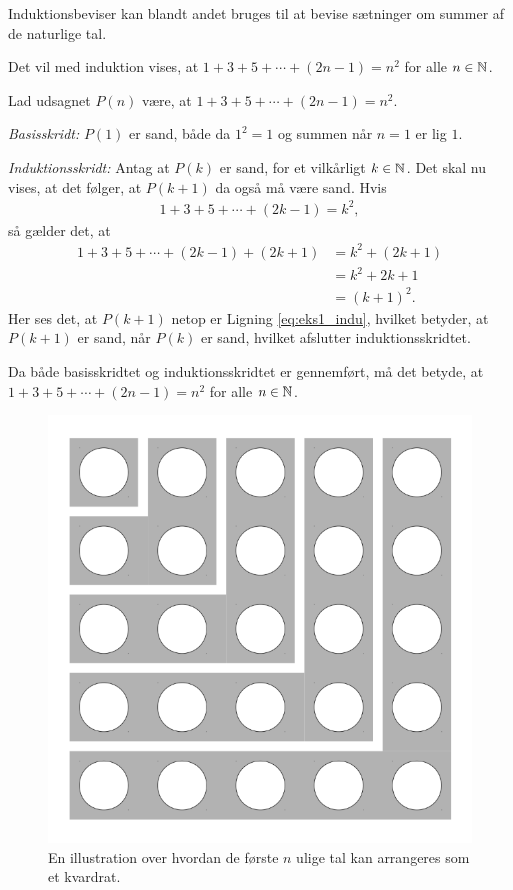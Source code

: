 Induktionsbeviser kan blandt andet bruges til at bevise sætninger om summer af de naturlige tal.
\begin{exmp}
	Det vil med induktion vises, at $1 + 3 + 5 + \dotsb + (2n-1) = n^2$ for alle $n \in \mathbb{N}$.

	Lad udsagnet $P(n)$ være, at $1 + 3 + 5 + \dotsb + (2n-1) = n^2$.
	
	\textit{Basisskridt:} $P(1)$ er sand, både da $1^2 = 1$ og summen når $n = 1$ er lig $1$.

	\textit{Induktionsskridt:} Antag at $P(k)$ er sand, for et vilkårligt $k \in \mathbb{N}$.
	Det skal nu vises, at det følger, at $P(k + 1)$ da også må være sand. 
	Hvis
	\begin{align}
		1 + 3 + 5 + \dotsb + (2k-1) 
		= k^2, \nonumber
	\end{align}
	så gælder det, at
	\begin{align}
		1 + 3 + 5 + \dotsb + (2k-1) + (2k+1) 
		&= k^2 + (2k + 1) \nonumber \\
		&= k^2 + 2k + 1 \nonumber \\
		&= \left( k + 1 \right) ^2. \label{eq:eks1_indu}
	\end{align}
	Her ses det, at $P(k + 1)$ netop er Ligning \eqref{eq:eks1_indu}, hvilket betyder, at $P(k + 1)$ er sand, når $P(k)$ er sand, hvilket afslutter induktionsskridtet.

	Da både basisskridtet og induktionsskridtet er gennemført, må det betyde, at $1 + 3 + 5 + \dotsb + (2n-1) = n^2$ for alle $n \in \mathbb{N}$.
\end{exmp}

\begin{figure}
	\centering
	\includegraphics[scale=0.21]{fig/img/sum_of_n_first_odd_integers.png}
	\caption{En illustration over hvordan de første $n$ ulige tal kan arrangeres som et kvardrat.} \label{fig1_indu}
\end{figure}

